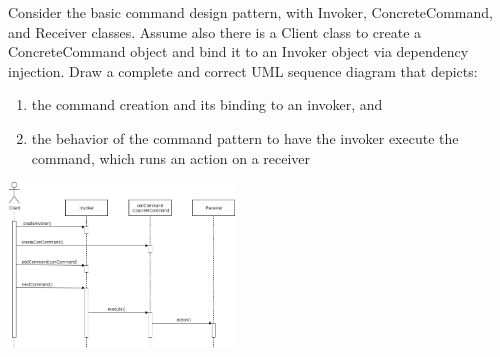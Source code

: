 \documentclass[8pt, letterpaper, titlepage]{article}
\begin{document}
\begin{multicols*}{3}
Consider the basic command design pattern, with Invoker, ConcreteCommand, and Receiver classes. Assume also there is a Client class to create a ConcreteCommand object and bind it to an Invoker object via dependency injection. Draw a complete and correct UML sequence diagram that depicts:
\begin{enumerate}
    \item the command creation and its binding to an invoker, and
    \item the behavior of the command pattern to have the invoker execute the command, which runs an action on a receiver
\end{enumerate}
\begin{center}
    \includegraphics[width=6cm]{sequence.png}
\end{center}

\end{multicols*}
\newpage
\end{document}

